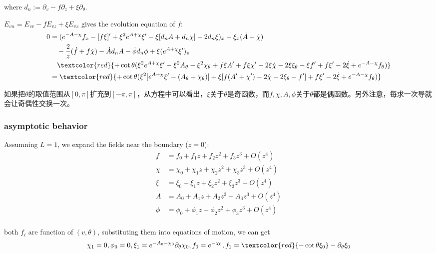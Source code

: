 \documentclass[12pt,a4paper]{ctexart}
\numberwithin{equation}{section}
\begin{document}
where $d_{n}:=\partial_{v}-f\partial_{z}+\xi\partial_{\theta}$.

$E_{vn}=E_{vv}-fE_{vz}+\xi E_{vx}$ gives the evolution equation of $f$:
\begin{equation}
    \begin{aligned}
        0&=(e^{-A-\chi}f_{x}-[f\xi]^{\prime}+\xi^{2}e^{A+\chi}\xi^{\prime}-\xi[d_{n}A+d_{n}\chi]-2d_{n}\xi)_{x}-\xi_x(\dot{A}+\dot{\chi})\\
        &\quad-\frac{2}{z}(\dot{f}+f\dot{\chi})-\dot{A}d_{n}A-\dot{\phi}d_n\phi+\xi(e^{A+\chi}\xi^{\prime})_{v}\\
        &\quad\textcolor{red}{+\cot\theta(\xi^2 e^{A+\chi}\xi'-\xi^2 A_\theta-\xi^2\chi_\theta+f\xi A'+f\xi\chi'-2\xi\dot{\chi}-2\xi\xi_\theta-\xi f'+f\xi'-2\dot{\xi}+e^{-A-\chi}f_\theta)}\\
        &=\textcolor{red}{+\cot\theta(\xi^2[e^{A+\chi}\xi'-(A_\theta+\chi_\theta)]+\xi[f(A'+\chi')-2\dot{\chi}-2\xi_\theta-f']+f\xi'-2\dot{\xi}+e^{-A-\chi}f_\theta)}
    \end{aligned}
\end{equation}

如果把$\theta$的取值范围从$[0,\pi]$扩充到$[-\pi,\pi]$，从方程中可以看出，$\xi$关于$\theta$是奇函数，而$f,\chi,A,\phi$关于$\theta$都是偶函数。另外注意，每求一次导就会让奇偶性交换一次。

\subsubsection{asymptotic behavior}

Assumning $L=1$, we expand the fields near the boundary ($z=0$):
\begin{equation}
    \begin{aligned}
        f&=f_0+f_1 z+f_2 z^2+f_3 z^3+O(z^4)\\
        \chi&=\chi_0+\chi_1 z+\chi_2 z^2+\chi_3 z^3+O(z^4)\\
        \xi&=\xi_0+\xi_1 z+\xi_2 z^2+\xi_3 z^3+O(z^4)\\
        A&=A_0+A_1 z+A_2 z^2+A_3 z^3+O(z^4)\\
        \phi&=\phi_0+\phi_1 z+\phi_2 z^2+\phi_3 z^3+O(z^4)\\
    \end{aligned}
\end{equation}

both $f_i$ are function of $(v,\theta)$, substituting them into equations of motion, we can get
\begin{equation}
    \chi_1=0,\phi_0=0,\xi_1=e^{-A_0-\chi_0}\partial_\theta\chi_0,f_0=e^{-\chi_0},f_1=\textcolor{red}{-\cot\theta\xi_0}-\partial_\theta\xi_0
\end{equation}
\end{document}

